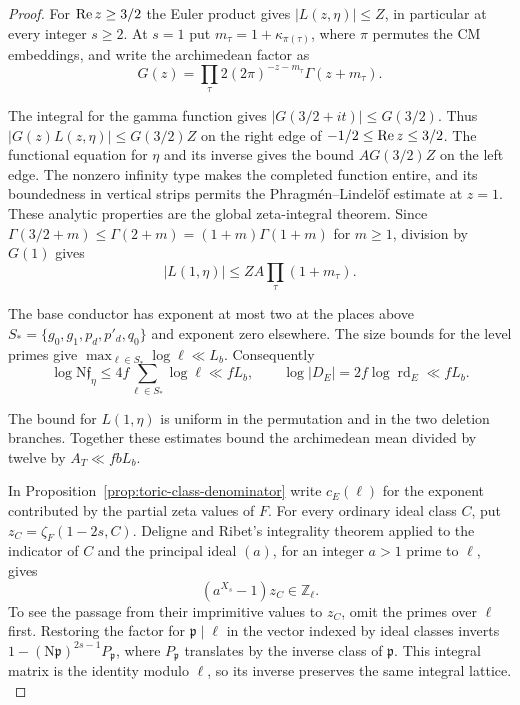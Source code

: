 \begin{proof}
For \(\operatorname{Re} z\ge3/2\) the Euler product gives \(|L(z,\eta)|\le Z\),
in particular at every integer \(s\ge2\).
At \(s=1\) put \(m_\tau=1+\kappa_{\pi(\tau)}\), where \(\pi\) permutes the
CM embeddings, and write the archimedean factor as
\[
 G(z)=\prod_\tau 2(2\pi)^{-z-m_\tau}\Gamma(z+m_\tau).
\]

The integral for the gamma function gives
\(|G(3/2+it)|\le G(3/2)\). Thus \(|G(z)L(z,\eta)|\le G(3/2)Z\)
on the right edge of \(-1/2\le\operatorname{Re} z\le3/2\).
The functional equation for \(\eta\) and its inverse gives the bound
\(A G(3/2)Z\) on the left edge. The nonzero infinity type makes the
completed function entire, and its boundedness in vertical strips
permits the Phragm\'en--Lindel\"of estimate at \(z=1\).
These analytic properties are the global zeta-integral theorem.
\cite[Sections~4.4--4.5]{tate-hecke}
Since \(\Gamma(3/2+m)\le\Gamma(2+m)=(1+m)\Gamma(1+m)\) for \(m\ge1\),
division by \(G(1)\) gives
\[
 |L(1,\eta)|\le ZA\prod_\tau(1+m_\tau).
\]

The base conductor has exponent at most two at the places above
\(S_*=\{g_0,g_1,p_d,p'_d,q_0\}\) and exponent zero elsewhere.
The size bounds for the level primes give
\(\max_{\ell\in S_*}\log\ell\ll L_b\).
Consequently
\[
 \log\mathrm N\mathfrak f_\eta\le4f\sum_{\ell\in S_*}\log\ell\ll fL_b,
 \qquad \log|D_E|=2f\log\operatorname{rd}_E\ll fL_b .
\]

The bound for \(L(1,\eta)\) is uniform in the permutation and in
the two deletion branches. Together these estimates bound the
archimedean mean divided by twelve by \(A_T\ll fbL_b\).

In Proposition~\ref{prop:toric-class-denominator} write \(c_E(\ell)\)
for the exponent contributed by the partial zeta values of \(F\).
For every ordinary ideal class \(C\), put
\(z_C=\zeta_F(1-2s,C)\).
Deligne and Ribet's integrality theorem applied to the indicator of
\(C\) and the principal ideal \((a)\), for an integer \(a>1\)
prime to \(\ell\), gives
\[
              (a^{X_s}-1)z_C\in\mathbb Z_\ell .
\]
To see the passage from their imprimitive values to \(z_C\), omit
the primes over \(\ell\) first. Restoring the factor for
\(\mathfrak p\mid\ell\) in the vector indexed by ideal classes
inverts \(1-(\mathrm N\mathfrak p)^{2s-1}P_{\mathfrak p}\),
where \(P_{\mathfrak p}\) translates by the inverse class of
\(\mathfrak p\). This integral matrix is the identity modulo \(\ell\),
so its inverse preserves the same integral lattice.
\cite[Theorem~0.4]{deligne-ribet-values}


\end{proof}

